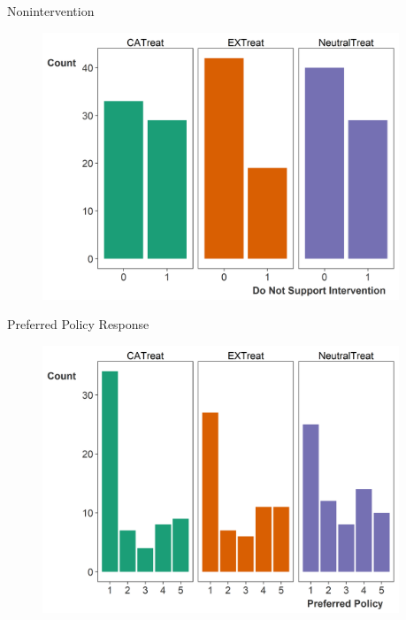 \documentclass[12pt]{beamer}
\begin{document}


\begin{frame}{Nonintervention}

\begin{figure}[htbp]
	\centering
		\includegraphics[width=0.95\textwidth]{raw-interv.png}
\end{figure}


\end{frame}



\begin{frame}{Preferred Policy Response}

\begin{figure}[htbp]
	\centering
		\includegraphics[width=0.95\textwidth]{raw-policy.png}
\end{figure}


\end{frame}
\end{document}
